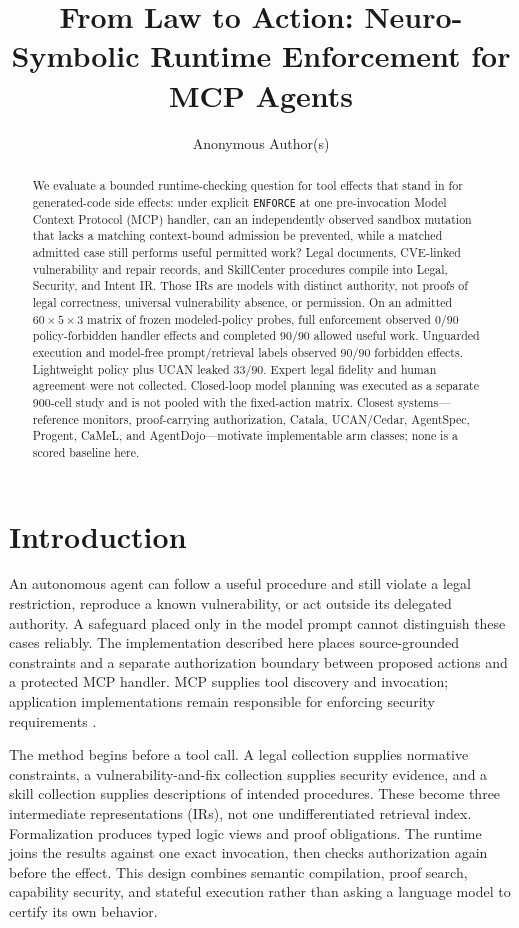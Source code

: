 \documentclass{article}
\title{From Law to Action: Neuro-Symbolic Runtime Enforcement for MCP Agents}
\author{Anonymous Author(s)}
\begin{document}
\maketitle
\begin{abstract}
We evaluate a bounded runtime-checking question for tool effects that stand in for generated-code side effects: under explicit \texttt{ENFORCE} at one pre-invocation Model Context Protocol (MCP) handler, can an independently observed sandbox mutation that lacks a matching context-bound admission be prevented, while a matched admitted case still performs useful permitted work? Legal documents, CVE-linked vulnerability and repair records, and SkillCenter procedures compile into Legal, Security, and Intent IR. Those IRs are models with distinct authority, not proofs of legal correctness, universal vulnerability absence, or permission. On an admitted $60\times 5\times 3$ matrix of frozen modeled-policy probes, full enforcement observed $0/90$ policy-forbidden handler effects and completed $90/90$ allowed useful work. Unguarded execution and model-free prompt/retrieval labels observed $90/90$ forbidden effects. Lightweight policy plus UCAN leaked $33/90$. Expert legal fidelity and human agreement were not collected. Closed-loop model planning was executed as a separate 900-cell study and is not pooled with the fixed-action matrix. Closest systems---reference monitors, proof-carrying authorization, Catala, UCAN/Cedar, AgentSpec, Progent, CaMeL, and AgentDojo---motivate implementable arm classes; none is a scored baseline here.
\end{abstract}

\section{Introduction}

An autonomous agent can follow a useful procedure and still violate a legal restriction, reproduce a known vulnerability, or act outside its delegated authority. A safeguard placed only in the model prompt cannot distinguish these cases reliably. The implementation described here places source-grounded constraints and a separate authorization boundary between proposed actions and a protected MCP handler. MCP supplies tool discovery and invocation; application implementations remain responsible for enforcing security requirements \citep{mcp,mcp-auth}.

The method begins before a tool call. A legal collection supplies normative constraints, a vulnerability-and-fix collection supplies security evidence, and a skill collection supplies descriptions of intended procedures. These become three intermediate representations (IRs), not one undifferentiated retrieval index. Formalization produces typed logic views and proof obligations. The runtime joins the results against one exact invocation, then checks authorization again before the effect. This design combines semantic compilation, proof search, capability security, and stateful execution rather than asking a language model to certify its own behavior.
\end{document}
